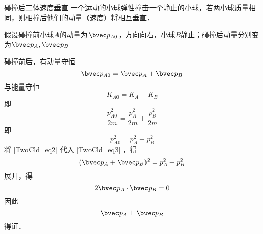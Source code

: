 \begin{example}{碰撞后二体速度垂直}
一个运动的小球弹性撞击一个静止的小球，若两小球质量相同，则相撞后他们的动量（速度）将相互垂直．

假设碰撞前小球$A$的动量为$\bvec p_{A0}$，方向向右，小球$B$静止；碰撞后动量分别变为$\bvec p_{A},\bvec p_{B}$

碰撞前后，有动量守恒
\begin{equation}\label{TwoCld_eq2}
\bvec p_{A0} = \bvec p_{A} + \bvec p_{B}
\end{equation}
与能量守恒
\begin{equation}
K_{A0} = K_{A} + K_{B}
\end{equation}
即
\begin{equation}
\frac{p_{A0}^2}{2m}=\frac{p_{A}^2}{2m}+\frac{p_{B}^2}{2m}
\end{equation}
即
\begin{equation}\label{TwoCld_eq3}
p_{A0}^2 = p_{A}^2+p_{B}^2
\end{equation}
将 \autoref{TwoCld_eq2} 代入 \autoref{TwoCld_eq3} ，得
\begin{equation}
(\bvec p_{A} + \bvec p_{B})^2=p_{A}^2+p_{B}^2
\end{equation}
展开，得
\begin{equation}
2\bvec p_{A} \cdot \bvec p_{B}=0
\end{equation}
因此
\begin{equation}
\bvec p_{A} \perp \bvec p_{B}
\end{equation}
得证．
\end{example}



